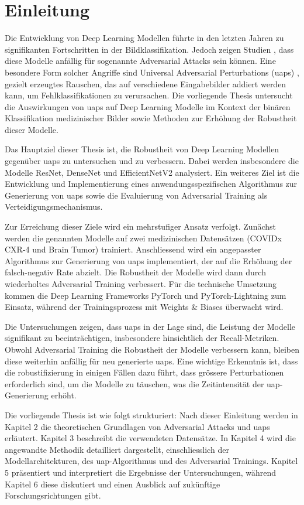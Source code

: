 \section{Einleitung}
Die Entwicklung von Deep Learning Modellen führte in den letzten Jahren zu signifikanten Fortschritten in der Bildklassifikation. Jedoch zeigen Studien \cite{szegedy_intriguing_2014}\cite{goodfellow_explaining_2015}, dass diese Modelle anfällig für sogenannte Adversarial Attacks sein können. Eine besondere Form solcher Angriffe sind Universal Adversarial Perturbations (\acrshort{uap}s) \cite{moosavi-dezfooli_universal_2017}, gezielt erzeugtes Rauschen, das auf verschiedene Eingabebilder addiert werden kann, um Fehlklassifikationen zu verursachen. Die vorliegende Thesis untersucht die Auswirkungen von \acrshort{uap}s auf Deep Learning Modelle im Kontext der binären Klassifikation medizinischer Bilder sowie Methoden zur Erhöhung der Robustheit dieser Modelle.

Das Hauptziel dieser Thesis ist, die Robustheit von Deep Learning Modellen gegenüber \acrshort{uap}s zu untersuchen und zu verbessern. Dabei werden insbesondere die Modelle ResNet, DenseNet und EfficientNetV2 analysiert. Ein weiteres Ziel ist die Entwicklung und Implementierung eines anwendungsspezifischen Algorithmus zur Generierung von \acrshort{uap}s sowie die Evaluierung von Adversarial Training als Verteidigungsmechanismus.

Zur Erreichung dieser Ziele wird ein mehrstufiger Ansatz verfolgt. Zunächst werden die genannten Modelle auf zwei medizinischen Datensätzen (COVIDx CXR-4 und Brain Tumor) trainiert. Anschliessend wird ein angepasster Algorithmus zur Generierung von \acrshort{uap}s implementiert, der auf die Erhöhung der falsch-negativ Rate abzielt. Die Robustheit der Modelle wird dann durch wiederholtes Adversarial Training verbessert. Für die technische Umsetzung kommen die Deep Learning Frameworks PyTorch und PyTorch-Lightning zum Einsatz, während der Trainingsprozess mit Weights \& Biases überwacht wird.

Die Untersuchungen zeigen, dass \acrshort{uap}s in der Lage sind, die Leistung der Modelle signifikant zu beeinträchtigen, insbesondere hinsichtlich der Recall-Metriken. Obwohl Adversarial Training die Robustheit der Modelle verbessern kann, bleiben diese weiterhin anfällig für neu generierte \acrshort{uap}s. Eine wichtige Erkenntnis ist, dass die \Gls{robustifizierung} in einigen Fällen dazu führt, dass grössere Perturbationen erforderlich sind, um die Modelle zu täuschen, was die Zeitintensität der \acrshort{uap}-Generierung erhöht.

Die vorliegende Thesis ist wie folgt strukturiert: Nach dieser Einleitung werden in Kapitel 2 die theoretischen Grundlagen von Adversarial Attacks und \acrshort{uap}s erläutert. Kapitel 3 beschreibt die verwendeten Datensätze. In Kapitel 4 wird die angewandte Methodik detailliert dargestellt, einschliesslich der Modellarchitekturen, des \acrshort{uap}-Algorithmus und des Adversarial Trainings. Kapitel 5 präsentiert und interpretiert die Ergebnisse der Untersuchungen, während Kapitel 6 diese diskutiert und einen Ausblick auf zukünftige Forschungsrichtungen gibt.